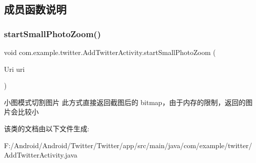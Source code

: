 \subsection{成员函数说明}
\mbox{\label{classcom_1_1example_1_1twitter_1_1_add_twitter_activity_a374b108c7a9984fc3a6f77ff78437c40}} 
\subsubsection{\texorpdfstring{start\+Small\+Photo\+Zoom()}{startSmallPhotoZoom()}}
{\footnotesize\ttfamily void com.\+example.\+twitter.\+Add\+Twitter\+Activity.\+start\+Small\+Photo\+Zoom (\begin{DoxyParamCaption}\item[{Uri}]{uri }\end{DoxyParamCaption})\hspace{0.3cm}{\ttfamily [inline]}}

小图模式切割图片 此方式直接返回截图后的 bitmap，由于内存的限制，返回的图片会比较小 

该类的文档由以下文件生成\+:\begin{DoxyCompactItemize}
\item 
F\+:/\+Android/\+Android/\+Twitter/\+Twitter/app/src/main/java/com/example/twitter/Add\+Twitter\+Activity.\+java\end{DoxyCompactItemize}
